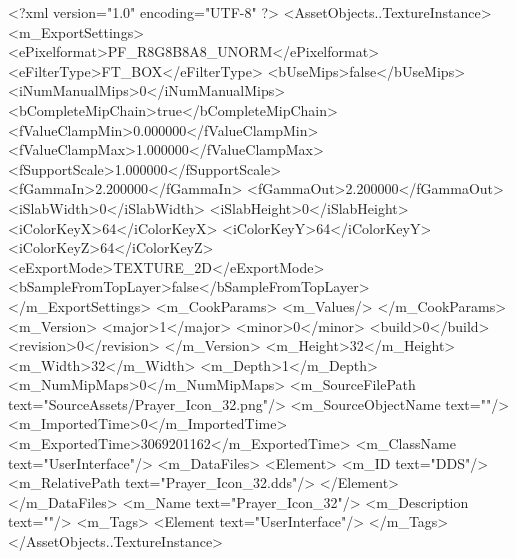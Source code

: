 <?xml version="1.0" encoding="UTF-8" ?>
<AssetObjects..TextureInstance>
	<m_ExportSettings>
		<ePixelformat>PF_R8G8B8A8_UNORM</ePixelformat>
		<eFilterType>FT_BOX</eFilterType>
		<bUseMips>false</bUseMips>
		<iNumManualMips>0</iNumManualMips>
		<bCompleteMipChain>true</bCompleteMipChain>
		<fValueClampMin>0.000000</fValueClampMin>
		<fValueClampMax>1.000000</fValueClampMax>
		<fSupportScale>1.000000</fSupportScale>
		<fGammaIn>2.200000</fGammaIn>
		<fGammaOut>2.200000</fGammaOut>
		<iSlabWidth>0</iSlabWidth>
		<iSlabHeight>0</iSlabHeight>
		<iColorKeyX>64</iColorKeyX>
		<iColorKeyY>64</iColorKeyY>
		<iColorKeyZ>64</iColorKeyZ>
		<eExportMode>TEXTURE_2D</eExportMode>
		<bSampleFromTopLayer>false</bSampleFromTopLayer>
	</m_ExportSettings>
	<m_CookParams>
		<m_Values/>
	</m_CookParams>
	<m_Version>
		<major>1</major>
		<minor>0</minor>
		<build>0</build>
		<revision>0</revision>
	</m_Version>
	<m_Height>32</m_Height>
	<m_Width>32</m_Width>
	<m_Depth>1</m_Depth>
	<m_NumMipMaps>0</m_NumMipMaps>
	<m_SourceFilePath text="SourceAssets/Prayer_Icon_32.png"/>
	<m_SourceObjectName text=""/>
	<m_ImportedTime>0</m_ImportedTime>
	<m_ExportedTime>3069201162</m_ExportedTime>
	<m_ClassName text="UserInterface"/>
	<m_DataFiles>
		<Element>
			<m_ID text="DDS"/>
			<m_RelativePath text="Prayer_Icon_32.dds"/>
		</Element>
	</m_DataFiles>
	<m_Name text="Prayer_Icon_32"/>
	<m_Description text=""/>
	<m_Tags>
		<Element text="UserInterface"/>
	</m_Tags>
</AssetObjects..TextureInstance>
